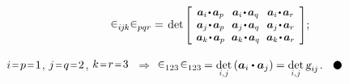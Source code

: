 \begin{otherlanguage}{russian}
\nopagebreak\vspace{-0.2em}\begin{equation*}
\levicivita_{i\hspace{-0.1ex}j\hspace{-0.1ex}k} \levicivita_{pqr} = \hspace{0.25ex}
\operatorname{det}\hspace{-0.1ex}
\scalebox{0.92}[0.92]{$\left[\hspace{-0.16ex}\begin{array}{c@{\hspace{.64em}}c@{\hspace{.64em}}c}
\bm{a}_i \narrowdotp\hspace{.12ex} \bm{a}_p & \bm{a}_i \narrowdotp\hspace{.12ex} \bm{a}_q & \bm{a}_i \narrowdotp\hspace{.12ex} \bm{a}_r \\
\bm{a}_j \narrowdotp\hspace{.12ex} \bm{a}_p & \bm{a}_j \narrowdotp\hspace{.12ex} \bm{a}_q & \bm{a}_j \narrowdotp\hspace{.12ex} \bm{a}_r \\
\bm{a}_k \narrowdotp\hspace{.12ex} \bm{a}_p & \bm{a}_k \narrowdotp\hspace{.12ex} \bm{a}_q & \bm{a}_k \narrowdotp\hspace{.12ex} \bm{a}_r
\end{array}\hspace{-0.12ex}\right]$} ;
\end{equation*}

\vspace{-0.1em} \noindent
${i \narroweq p \narroweq 1}$, ${j \narroweq q \narroweq 2}$, ${k \narroweq r \narroweq 3}$ ${\,\Rightarrow}$ ${\levicivita_{123} \hspace{.2ex} \levicivita_{123} \hspace{-0.15ex} = \underset{\raisebox{.15em}{\scalebox{.7}{$i$,$\hspace{.15ex}j$}}}{\operatorname{det}} \left( \bm{a}_i \dotp \bm{a}_j \right) \hspace{-0.1ex} = \underset{\raisebox{.15em}{\scalebox{.7}{$i$,$\hspace{.15ex}j$}}}{\operatorname{det}} \, \textsl{g}_{i\hspace{-0.1ex}j}}$.
${ \hspace{.6em}
\tikz[baseline=-0.6ex] \draw [color=black, fill=black] (0, 0) circle (.8ex); }$


\end{otherlanguage}
